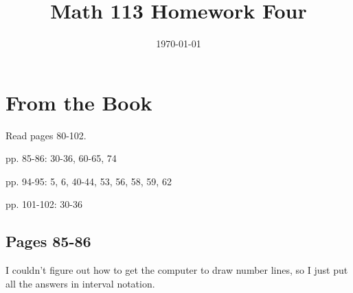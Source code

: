 \documentclass[fleqn,addpoints]{exam}
\title{Math 113 Homework Four}
\author{}
\date{\today}
\begin{document}
\maketitle

\section{From the Book}

\begin{itemize*}
\item Read pages 80-102.
\item pp. 85-86: 30-36, 60-65, 74
\item pp. 94-95: 5, 6, 40-44, 53, 56, 58, 59, 62
\item pp. 101-102: 30-36
\end{itemize*}

\ifprintanswers

\subsection{Pages 85-86} 

I couldn't figure out how to get the computer to draw number lines, so I just put all the answers in interval notation.
\end{document}
